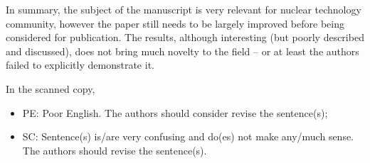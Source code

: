 \documentclass[14pt,twoside]{report}
\begin{document}
In summary, the subject of the manuscript is very relevant for nuclear technology community, however the paper still needs to be largely improved before being considered for publication. The results, although interesting (but poorly described and discussed), does not bring much novelty to the field -- or at least the authors failed to explicitly demonstrate it. 



In the scanned copy,
\begin{itemize}
\item PE: Poor English. The authors should consider revise the sentence(s);
\item SC: Sentence(s) is/are very confusing and do(es) not make any/much sense. The authors should revise the sentence(s).
\end{itemize}
\end{document}
